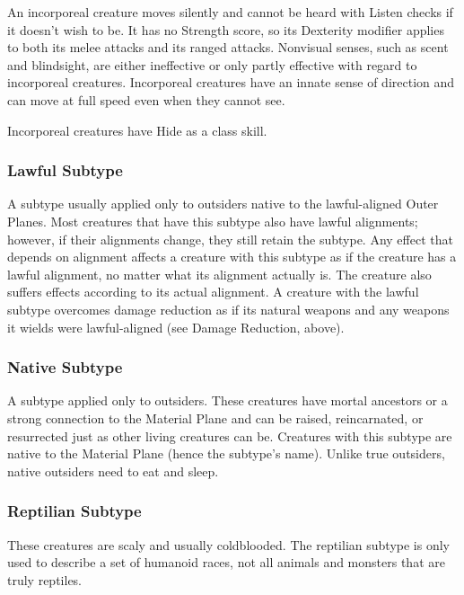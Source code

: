 {An incorporeal creature moves silently and cannot be heard with Listen checks if it doesn't wish to be. It has no Strength score, so its Dexterity modifier applies to both its melee attacks and its ranged attacks. Nonvisual senses, such as scent and blindsight, are either ineffective or only partly effective with regard to incorporeal creatures. Incorporeal creatures have an innate sense of direction and can move at full speed even when they cannot see.

Incorporeal creatures have Hide as a class skill.

\subsubsection{Lawful Subtype} A subtype usually applied only to outsiders native to the lawful-aligned Outer Planes. Most creatures that have this subtype also have lawful alignments; however, if their alignments change, they still retain the subtype. Any effect that depends on alignment affects a creature with this subtype as if the creature has a lawful alignment, no matter what its alignment actually is. The creature also suffers effects according to its actual alignment. A creature with the lawful subtype overcomes damage reduction as if its natural weapons and any weapons it wields were lawful-aligned (see Damage Reduction, above).

\subsubsection{Native Subtype} A subtype applied only to outsiders. These creatures have mortal ancestors or a strong connection to the Material Plane and can be raised, reincarnated, or resurrected just as other living creatures can be. Creatures with this subtype are native to the Material Plane (hence the subtype's name). Unlike true outsiders, native outsiders need to eat and sleep. 

\subsubsection{Reptilian Subtype} These creatures are scaly and usually coldblooded. The reptilian subtype is only used to describe a set of humanoid races, not all animals and monsters that are truly reptiles.

}

